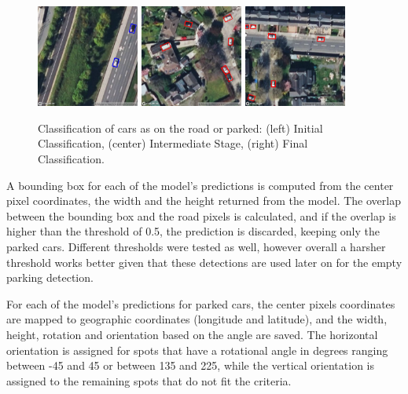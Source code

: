 \begin{figure}[htbp]
  \centering
  \includegraphics[width=0.30\textwidth]{images/road_mask_classification1.png}
  \hfill
  \includegraphics[width=0.30\textwidth]{images/road_mask_classification2.png}
  \hfill
  \includegraphics[width=0.30\textwidth]{images/road_mask_classification3.png}
  \caption{Classification of cars as on the road or parked: (left) Initial Classification, (center) Intermediate Stage, (right) Final Classification.}
  \label{fig:road_mask_classification}
\end{figure}

A bounding box for each of the model's predictions is computed from the center
pixel coordinates, the width and the height returned from the model. The overlap
between the bounding box and the road pixels is calculated, and if the overlap
is higher than the threshold of 0.5, the prediction is discarded, keeping only
the parked cars. Different thresholds were tested as well, however overall a
harsher threshold works better given that these detections are used later on for
the empty parking detection.

For each of the model's predictions for parked cars, the center pixels
coordinates are mapped to geographic coordinates (longitude and latitude), and
the width, height, rotation and orientation based on the angle are saved. The
horizontal orientation is assigned for spots that have a rotational angle in
degrees ranging between -45 and 45 or between 135 and 225, while the vertical
orientation is assigned to the remaining spots that do not fit the criteria.

